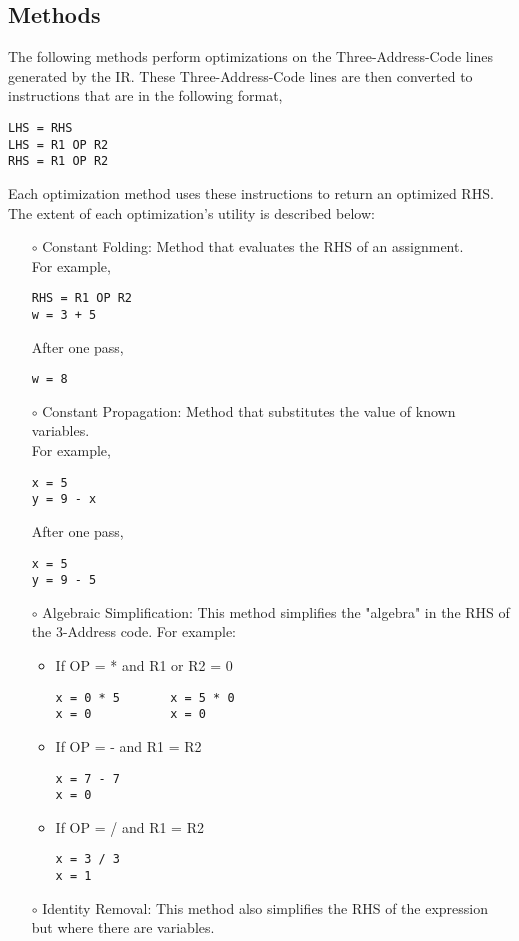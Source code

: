 \documentclass{scrartcl}
\begin{document}
\subsection{Methods}
The following methods perform optimizations on the Three-Address-Code lines generated by the IR.
These Three-Address-Code lines are then converted to instructions that are in the following format,
\begin{verbatim}
LHS = RHS
LHS = R1 OP R2
RHS = R1 OP R2
\end{verbatim}
Each optimization method uses these instructions to return an optimized RHS.
The extent of each optimization's utility is described below:
\begin{itemize}
\item[$\circ$] Constant Folding: Method that evaluates the RHS of an assignment. \\
For example,
\begin{verbatim}
RHS = R1 OP R2
w = 3 + 5
\end{verbatim}
After one pass,
\begin{verbatim}
w = 8
\end{verbatim}
\item[$\circ$] Constant Propagation: Method that substitutes the value of known variables. \\
For example,
\begin{verbatim}
x = 5
y = 9 - x
\end{verbatim}
After one pass,
\begin{verbatim}
x = 5
y = 9 - 5
\end{verbatim}
\item[$\circ$] Algebraic Simplification: This method simplifies the "algebra" in the RHS of the 3-Address code.
For example:
\begin{itemize}
\item If OP = * and R1 or R2 = 0
\begin{verbatim}
x = 0 * 5       x = 5 * 0
x = 0           x = 0
\end{verbatim}
\item If OP = - and R1 = R2
\begin{verbatim}
x = 7 - 7
x = 0
\end{verbatim}
\item If OP = / and R1 = R2
\begin{verbatim}
x = 3 / 3
x = 1
\end{verbatim}
\end{itemize}
\item[$\circ$] Identity Removal: This method also simplifies the RHS of the expression but where there are variables.

\end{itemize}
\end{document}
